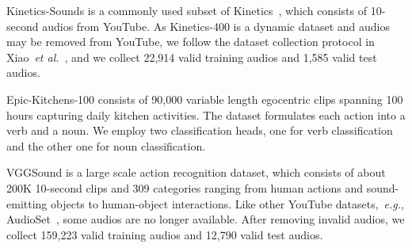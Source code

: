 \documentclass{article}
\def\eg{\emph{e.g.}}
\def\etal{\emph{et al.}}
\begin{document}
Kinetics-Sounds is a commonly used subset of Kinetics~\cite{kay2017kinetics}, which consists of 10-second audios from YouTube. As Kinetics-400 is a dynamic dataset and audios may be removed from YouTube, we follow the dataset collection protocol in Xiao~\etal~\cite{xiao2020audiovisual}, and we collect 22,914 valid training audios and 1,585 valid test audios. 

Epic-Kitchens-100 consists of 90,000 variable length egocentric clips spanning 100 hours capturing daily kitchen activities. The dataset formulates each action into a verb and a noun. We employ two classification heads, one for verb classification and the other one for noun classification.


VGGSound is a large scale action recognition dataset, which consists of about 200K 10-second clips and 309 categories ranging from human actions and sound-emitting objects to human-object interactions. Like other YouTube datasets,~\eg, AudioSet~\cite{gemmeke2017audio}, some audios are no longer available. After removing invalid audios, we collect 159,223 valid training audios and 12,790 valid test audios.
\end{document}
